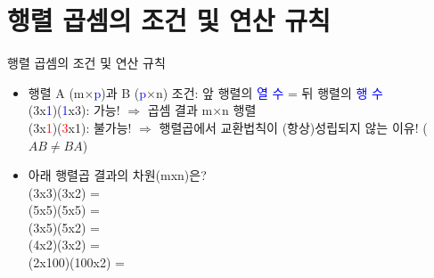 \documentclass[aspectratio=169]{beamer}
\begin{document}
\section{행렬 곱셈의 조건 및 연산 규칙}
\begin{frame}{행렬 곱셈의 조건 및 연산 규칙}
\begin{itemize}
    \item 행렬 A (m×\textcolor{blue}{p})과 B (\textcolor{blue}{p}×n) 조건: 앞 행렬의 \textcolor{blue}{열 수} = 뒤 행렬의 \textcolor{blue}{행 수} \\
       (3x\textcolor{blue}{1})(\textcolor{blue}{1}x3): 가능! $\Rightarrow$ 곱셈 결과 m×n 행렬 \\
       (3x\textcolor{red}{1})(\textcolor{red}{3}x1): 불가능! $\Rightarrow$ 행렬곱에서 교환법칙이 (항상)성립되지 않는 이유! ($AB \neq BA$)\\
    \item 아래 행렬곱 결과의 차원(mxn)은?
       \\ (3x3)(3x2) =
       \\ (5x5)(5x5) =
       \\ (3x5)(5x2) =
       \\ (4x2)(3x2) =
       \\ (2x100)(100x2) =
\end{itemize}
\end{frame}
\end{document}

